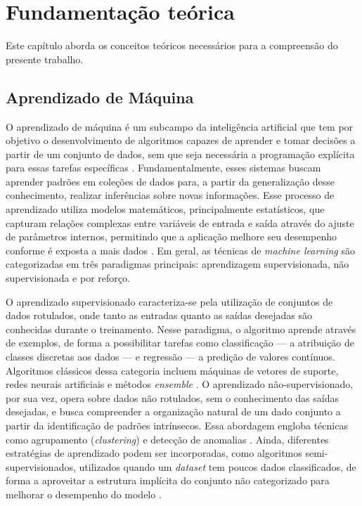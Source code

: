 \chapter{Fundamentação teórica}

Este capítulo aborda os conceitos teóricos necessários para a compreensão do presente trabalho.

\section{Aprendizado de Máquina}

O aprendizado de máquina é um subcampo da inteligência artificial que tem por objetivo o desenvolvimento de algoritmos capazes de aprender e tomar decisões a partir de um conjunto de dados, sem que seja necessária a programação explícita para essas tarefas específicas \cite{mlDietterich}. Fundamentalmente, esses sistemas buscam aprender padrões em coleções de dados para, a partir da generalização desse conhecimento, realizar inferências sobre novas informações. Esse processo de aprendizado utiliza modelos matemáticos, principalmente estatísticos, que capturam relações complexas entre variáveis de entrada e saída através do ajuste de parâmetros internos, permitindo que a aplicação melhore seu desempenho conforme é exposta a mais dados \cite{mlSarker}. Em geral, as técnicas de \textit{machine learning} são categorizadas em três paradigmas principais: aprendizagem supervisionada, não supervisionada e por reforço.

O aprendizado supervisionado caracteriza-se pela utilização de conjuntos de dados rotulados, onde tanto as entradas quanto as saídas desejadas são conhecidas durante o treinamento. Nesse paradigma, o algoritmo aprende através de exemplos, de forma a possibilitar tarefas como classificação — a atribuição de classes discretas aos dados — e regressão — a predição de valores contínuos. Algoritmos clássicos dessa categoria incluem máquinas de vetores de suporte, redes neurais artificiais e métodos \textit{ensemble} \cite{mlSarker}. O aprendizado não-supervisionado, por sua vez, opera sobre dados não rotulados, sem o conhecimento das saídas desejadas, e busca compreender a organização natural de um dado conjunto a partir da identificação de padrões intrínsecos. Essa abordagem engloba técnicas como agrupamento (\textit{clustering}) e detecção de anomalias \cite{mlSarker}. Ainda, diferentes estratégias de aprendizado podem ser incorporadas, como algoritmos semi-supervisionados, utilizados quando um \textit{dataset} tem poucos dados classificados, de forma a aproveitar a estrutura implícita do conjunto não categorizado para melhorar o desempenho do modelo \cite{mlSarker}.

